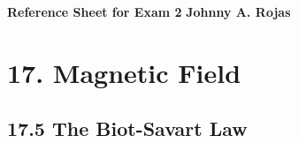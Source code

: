\documentclass[12pt,twocolumn]{article}
\begin{document}
\begin{center}
  {\Large \textbf{Reference Sheet for Exam 2}}
  {\textbf{Johnny A. Rojas }}\\
\end{center}

\section*{17. Magnetic Field}
\subsection*{17.5 The Biot-Savart Law}
\end{document}
